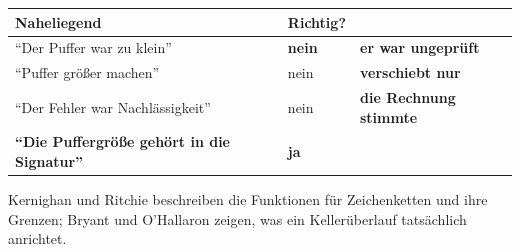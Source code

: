\begin{warnung}
\begin{center}
\renewcommand{\arraystretch}{1.5}
\begin{tabular}{@{}P{3.2cm}P{2.2cm}P{2.4cm}@{}}
\toprule
\textbf{Naheliegend} & \textbf{Richtig?} & \\
\midrule
\enquote{Der Puffer war zu klein} & \textcolor{akzent}{\textbf{nein}} & \textcolor{akzent}{\textbf{er war ungeprüft}}\\
\enquote{Puffer größer machen} & \textcolor{akzent}{nein} & \textbf{verschiebt nur}\\
\enquote{Der Fehler war Nachlässigkeit} & \textcolor{akzent}{nein} & \textbf{die Rechnung stimmte}\\
\textbf{\enquote{Die Puffergröße gehört in die Signatur}} & \textcolor{gruen}{\textbf{ja}} & \\
\bottomrule
\end{tabular}
\end{center}

\begin{center}
\begin{minipage}{0.88\textwidth}
\end{minipage}
\end{center}

\begin{center}
\end{center}
\end{warnung}
\vspace{-4pt}
\noindent Kernighan und Ritchie beschreiben die Funk\-tio\-nen für Zei\-chen\-ket\-ten und ihre Grenzen; Bryant und O'Hallaron zeigen, was ein Kel\-ler\-über\-lauf tat\-säch\-lich anrichtet.
